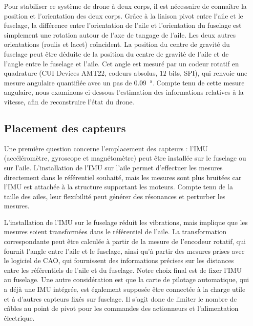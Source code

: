 Pour stabiliser ce système de drone à deux corps, il est nécessaire de connaître la position et l'orientation des deux corps. Grâce à la liaison pivot entre l'aile et le fuselage, la différence entre l'orientation de l'aile et l'orientation du fuselage est simplement une rotation autour de l'axe de tangage de l'aile. Les deux autres orientations (roulis et lacet) coïncident. La position du centre de gravité du fuselage peut être déduite de la position du centre de gravité de l'aile et de l'angle entre le fuselage et l'aile. Cet angle est mesuré par un codeur rotatif en quadrature (CUI Devices AMT22, codeurs absolus, 12 bits, SPI), qui renvoie une mesure angulaire quantifiée avec un pas de \SI{0,09}{\degree}. Compte tenu de cette mesure angulaire, nous examinons ci-dessous l'estimation des informations relatives à la vitesse, afin de reconstruire l'état du drone.

\subsection{Placement des capteurs}
\label{subsec:sens_pos}
Une première question concerne l'emplacement des capteurs : l'IMU (accéléromètre, gyroscope et magnétomètre) peut être installée sur le fuselage ou sur l'aile. 
L'installation de l'IMU sur l'aile permet d'effectuer les mesures directement dans le référentiel souhaité, mais les mesures sont plus bruitées car l'IMU est attachée à la structure supportant les moteurs. Compte tenu de la taille des ailes, leur flexibilité peut générer des résonances et perturber les mesures. 

L'installation de l'IMU sur le fuselage réduit les vibrations, mais implique que les mesures soient transformées dans le référentiel de l'aile. La transformation correspondante peut être calculée à partir de la mesure de l'encodeur rotatif, qui fournit l'angle entre l'aile et le fuselage, ainsi qu'à partir des mesures prises avec le logiciel de CAO, qui fournissent des informations précises sur les distances entre les référentiels de l'aile et du fuselage. Notre choix final est de fixer l'IMU au fuselage. Une autre considération est que la carte de pilotage automatique, qui a déjà une IMU intégrée, est également supposée être connectée à la charge utile et à d'autres capteurs fixés sur fuselage. Il s'agit donc de limiter le nombre de câbles au point de pivot pour les commandes des actionneurs et l'alimentation électrique.

